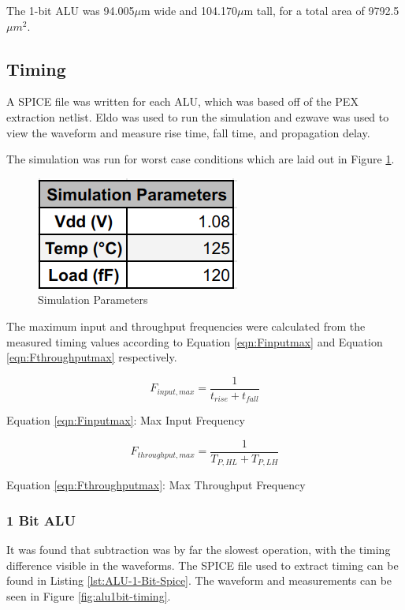 \documentclass[11pt]{article}
\begin{document}
			The 1-bit ALU was 94.005$\mu$m wide and 104.170$\mu$m tall, for a total area of 9792.5$\mu m^2$.

	
	\subsection{Timing}
	
		A SPICE file was written for each ALU, which was based off of the PEX extraction netlist. Eldo was used to run the simulation and ezwave was used to view the waveform and measure rise time, fall time, and propagation delay.
		
		The simulation was run for worst case conditions which are laid out in Figure \ref{fig:simulation-parameters}. 
		
		\begin{figure}[H]
			\centering
			\includegraphics[width=0.4\linewidth]{"Pictures/Simulation Parameters"}
			\caption{Simulation Parameters}
			\label{fig:simulation-parameters}
		\end{figure}
		
		
		The maximum input and throughput frequencies were calculated from the measured timing values according to Equation \ref{eqn:Finputmax} and Equation \ref{eqn:Fthroughputmax} respectively. 
		
		\begin{equation}\label{eqn:Finputmax}
		F_{input,max} = \frac{1}{t_{rise}+t_{fall}}
		\end{equation}
		\begin{center}
			Equation \ref{eqn:Finputmax}: Max Input Frequency
		\end{center}
		
		\begin{equation}\label{eqn:Fthroughputmax}
		F_{throughput,max} = \frac{1}{T_{P,HL}+T_{P,LH}}
		\end{equation}
		\begin{center}
			Equation \ref{eqn:Fthroughputmax}: Max Throughput Frequency
		\end{center}
	
		\subsubsection{1 Bit ALU}
			It was found that subtraction was by far the slowest operation, with the timing difference visible in the waveforms.  The SPICE file used to extract timing can be found in Listing \ref{lst:ALU-1-Bit-Spice}. The waveform and measurements can be seen in Figure \ref{fig:alu1bit-timing}.
		
\end{document}
